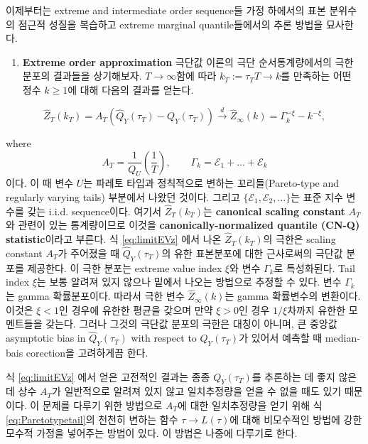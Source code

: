 \documentclass[b5paper,]{scrbook}
\providecommand{\tightlist}{%
  \setlength{\itemsep}{0pt}\setlength{\parskip}{0pt}}
\theoremstyle{plain}
\theoremstyle{definition}
\numberwithin{equation}{section}
\begin{document}
이제부터는 extreme and intermediate order sequence들 가정 하에서의 표본 분위수의 점근적 성질을 복습하고 extreme marginal quantile들에서의 추론 방법을 묘사한다.

\begin{enumerate}
\def\labelenumi{\arabic{enumi}.}
\tightlist
\item
  \textbf{Extreme order approximation} 극단값 이론의 극단 순서통계량에서의 극한 분포의 결과들을 상기해보자. \(T\rightarrow\infty\)함에 따라 \(k_{T}:=\tau_{T}T\rightarrow k\)를 만족하는 어떤 정수 \(k\geq 1\)에 대해 다음의 결과를 얻는다.
\end{enumerate}

\begin{equation}
\hat{Z}_{T}(k_{T}) = A_{T}(\hat{Q}_{Y}(\tau_{T}) - Q_{Y}(\tau_{T})) \stackrel{d}{\rightarrow} \hat{Z}_{\infty}(k) = \Gamma_{k}^{-\xi} - k^{-\xi},
\label{eq:limitEVz}
\end{equation}

where
\[A_{T}=\frac{1}{Q_{U}}(\frac{1}{T}), \qquad{\Gamma_{k} = \mathcal{E}_{1} + \ldots + \mathcal{E}_{k}}\]
이다. 이 때 변수 \(U\)는 파레토 타입과 정칙적으로 변하는 꼬리들(Pareto-type and regularly varying tails) 부분에서 나왔던 것이다. 그리고 \(\{\mathcal{E}_{1},\mathcal{E}_{2},\ldots\}\)는 표준 지수 변수를 갖는 i.i.d. sequence이다. 여기서 \(\hat{Z}_{T}(k_{T})\)는 \textbf{canonical scaling constant} \(A_{T}\)와 관련이 있는 통계량이므로 이것을 \textbf{canonically-normalized quantile (CN-Q) statistic}이라고 부른다. 식 \eqref{eq:limitEVz} 에서 나온 \(\hat{Z}_{T}(k_{T})\)의 극한은 scaling constant \(A_{T}\)가 주어졌을 때 \(\hat{Q}_{Y}(\tau_{T})\)의 유한 표본분포에 대한 근사로써의 극단값 분포를 제공한다. 이 극한 분포는 extreme value index \(\xi\)와 변수 \(\Gamma_{k}\)로 특성화된다. Tail index \(\xi\)는 보통 알려져 있지 않으나 밑에서 나오는 방법으로 추정할 수 있다. 변수 \(\Gamma_{k}\)는 gamma 확률분포이다. 따라서 극한 변수 \(\hat{Z}_{\infty}(k)\)는 gamma 확률변수의 변환이다. 이것은 \(\xi <1\)인 경우에 유한한 평균을 갖으며 만약 \(\xi>0\)인 경우 \(1/\xi\)차까지 유한한 모멘트들을 갖는다. 그러나 그것의 극단값 분포의 극한은 대칭이 아니며, 큰 중앙값 asymptotic bias in \(\hat{Q}_{Y}(\tau_{T})\) with respect to \(Q_{Y}(\tau_{T})\)가 있어서 예측할 때 median-bais corection을 고려하게끔 한다.

식 \eqref{eq:limitEVz} 에서 얻은 고전적인 결과는 종종 \(Q_{Y}(\tau_{T})\)를 추론하는 데 좋지 않은 데 상수 \(A_{T}\)가 일반적으로 알려져 있지 않고 일치추정량을 얻을 수 없을 때도 있기 때문이다. 이 문제를 다루기 위한 방법으로 \(A_{T}\)에 대한 일치추정량을 얻기 위해 식 \eqref{eq:Paretotypetail}의 천천히 변하는 함수 \(\tau \rightarrow L(\tau)\)에 대해 비모수적인 방법에 강한 모수적 가정을 넣어주는 방법이 있다. 이 방법은 나중에 다루기로 한다.
\end{document}
